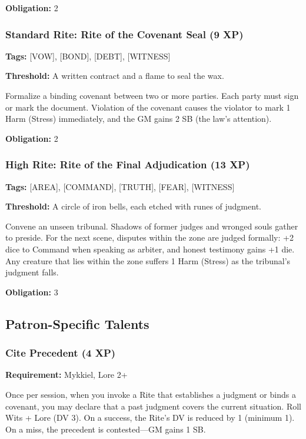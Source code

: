 \textbf{Obligation:} 2

\subsubsection{Standard Rite: Rite of the Covenant Seal (9 XP)}

\textbf{Tags:} [VOW], [BOND], [DEBT], [WITNESS]

\textbf{Threshold:} A written contract and a flame to seal the wax.

Formalize a binding covenant between two or more parties. Each party must sign or mark the document. Violation of the covenant causes the violator to mark 1 Harm (Stress) immediately, and the GM gains 2 SB (the law's attention).

\textbf{Obligation:} 2

\subsubsection{High Rite: Rite of the Final Adjudication (13 XP)}

\textbf{Tags:} [AREA], [COMMAND], [TRUTH], [FEAR], [WITNESS]

\textbf{Threshold:} A circle of iron bells, each etched with runes of judgment.

Convene an unseen tribunal. Shadows of former judges and wronged souls gather to preside. For the next scene, disputes within the zone are judged formally: +2 dice to Command when speaking as arbiter, and honest testimony gains +1 die. Any creature that lies within the zone suffers 1 Harm (Stress) as the tribunal's judgment falls.

\textbf{Obligation:} 3

\subsection{Patron-Specific Talents}

\subsubsection{Cite Precedent (4 XP)}

\textbf{Requirement:} Mykkiel, Lore 2+

Once per session, when you invoke a Rite that establishes a judgment or binds a covenant, you may declare that a past judgment covers the current situation. Roll Wits + Lore (DV 3). On a success, the Rite's DV is reduced by 1 (minimum 1). On a miss, the precedent is contested—GM gains 1 SB.

